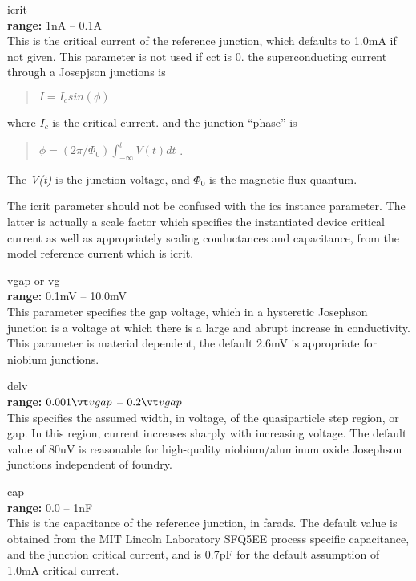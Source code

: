\begin{description}
\item{\vt icrit}\\
{\bf range:} 1nA -- 0.1A\\
This is the critical current of the reference junction, which defaults
to 1.0mA if not given.  This parameter is not used if {\vt cct} is 0.
the superconducting current through a Josepjson junctions is
\begin{quote}
$I = I_c sin(\phi)$
\end{quote}
where $I_c$ is the critical current. and the junction ``phase'' is
\begin{quote}
$\phi = (2\pi/\Phi_0)\int^t_{-\infty} V(t)dt$ .
\end{quote}
The {\it V(t)} is the junction voltage, and $\Phi_0$ is the magnetic
flux quantum.

The {\vt icrit} parameter should not be confused with the
{\vt ics} instance parameter.  The latter is actually a scale
factor which specifies the instantiated device critical current as
well as appropriately scaling conductances and capacitance, from
the model reference current which is {\vt icrit}.

\item{{\vt vgap} or {\vt vg}}\\
{\bf range:} 0.1mV -- 10.0mV\\
This parameter specifies the gap voltage, which in a hysteretic
Josephson junction is a voltage at which there is a large and abrupt
increase in conductivity.  This parameter is material dependent, the
default 2.6mV is appropriate for niobium junctions.

\item{\vt delv}\\
{\bf range:} $0.001{\vt vgap}$ -- $0.2{\vt vgap}$\\
This specifies the assumed width, in voltage, of the quasiparticle
step region, or gap.  In this region, current increases sharply with
increasing voltage.  The default value of 80uV is reasonable for
high-quality niobium/aluminum oxide Josephson junctions independent of
foundry.

\item{\vt cap}\\
{\bf range:} 0.0 -- 1nF\\
This is the capacitance of the reference junction, in farads.  The
default value is obtained from the MIT Lincoln Laboratory SFQ5EE
process\cite{tolpygo} specific capacitance, and the junction critical
current, and is 0.7pF for the default assumption of 1.0mA critical
current.


\end{description}
